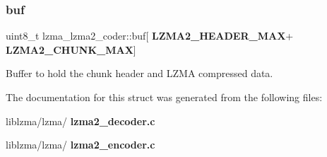 \subsubsection{buf}
{\footnotesize\ttfamily uint8\+\_\+t lzma\+\_\+lzma2\+\_\+coder\+::buf[\textbf{ L\+Z\+M\+A2\+\_\+\+H\+E\+A\+D\+E\+R\+\_\+\+M\+AX}+\textbf{ L\+Z\+M\+A2\+\_\+\+C\+H\+U\+N\+K\+\_\+\+M\+AX}]}



Buffer to hold the chunk header and L\+Z\+MA compressed data. 



The documentation for this struct was generated from the following files\+:\begin{DoxyCompactItemize}
\item 
liblzma/lzma/\textbf{ lzma2\+\_\+decoder.\+c}\item 
liblzma/lzma/\textbf{ lzma2\+\_\+encoder.\+c}\end{DoxyCompactItemize}
